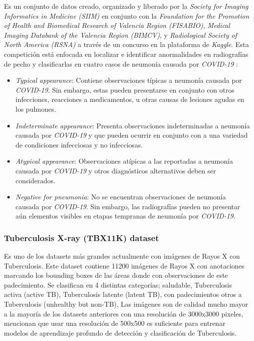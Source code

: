 Es un conjunto de datos creado, organizado y liberado por la \textit{Society for Imaging Informatics
in Medicine (SIIM)} en conjunto con la
\textit{Foundation for the Promotion of Health and Biomedical Research of Valencia Region (FISABIO)},
\textit{Medical Imaging Databank of the Valencia Region (BIMCV)}, y
\textit{Radiological Society of North America (RSNA)} \cite{siim_det_challenge} a través de un
concurso en la plataforma de \textit{Kaggle}. Esta competición está enfocada en localizar
e identificar anormalidades en radiografías de pecho y clasificarlas en cuatro casos de neumonía
causada por \textit{COVID-19} \cite{00005382-202011000-00004}:

\begin{itemize}
    \item \textit{Typical appearance}: Contiene observaciones típicas a neumonía causada por
          \textit{COVID-19}. Sin embargo, estas pueden presentarse en conjunto con otros infecciones,
          reacciones a medicamentos, u otras causas de lesiones agudas en los pulmones.
    \item \textit{Indeterminate appearance}: Presenta observaciones indeterminadas a neumonía
          causada por \textit{COVID-19} y que pueden ocurrir en conjunto con a una variedad de
          condiciones infecciosas y no infecciosas.
    \item \textit{Atypical appearance}: Observaciones atípicas a las reportadas a neumonía causada
          por \textit{COVID-19} y otros diagnósticos alternativos deben ser considerados.
    \item \textit{Negative for pneumonia}: No se encuentran observaciones de neumonía causada por
          \textit{COVID-19}. Sin embargo, las radiografías pueden no presentar aún elementos visibles
          en etapas tempranas de neumonía por \textit{COVID-19}.
\end{itemize}

\subsubsection{Tuberculosis X-ray (TBX11K) dataset}

Es uno de los datasets más grandes actualmente con imágenes de Rayos X con Tuberculosis. Este
dataset contiene 11200 imágenes de Rayos X con anotaciones marcando los bounding boxes de las
áreas donde con observaciones de este padecimiento. Se clasifican en 4 distintas categorías;
saludable, Tuberculosis activa (active TB), Tuberculosis latente (latent TB), con padecimientos otros a
Tuberculosis (unhealthy but non-TB). Las imágenes son de calidad mucho mayor a la mayoría de los
datasets anteriores con una resolución de 3000x3000 pixeles, \citeauthor{9156613} mencionan que
usar una resolución de 500x500 es suficiente para entrenar modelos de aprendizaje profundo de
detección y clasificación de Tuberculosis.


